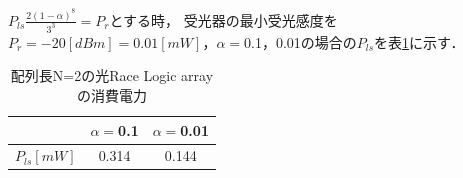 $P_{ls}\frac{2(1-\alpha)^8}{3^3} = P_{r}$とする時，
受光器の最小受光感度を$P_{r}=-20[dBm]=0.01[mW]$，$\alpha = $0.1，0.01の場合の$P_{ls}$を表\ref{pls}に示す．
\begin{table}[t!]
\begin{center}
\caption{配列長N=2の光Race Logic arrayの消費電力}
\begin{tabular}{|c|c|c|} \hline
&$\alpha = $0.1&$\alpha = $0.01\\ \hline \hline
$P_{ls}[mW]$&0.314&0.144\\ \hline
\end{tabular}
\label{pls}
\end{center}
\end{table}
